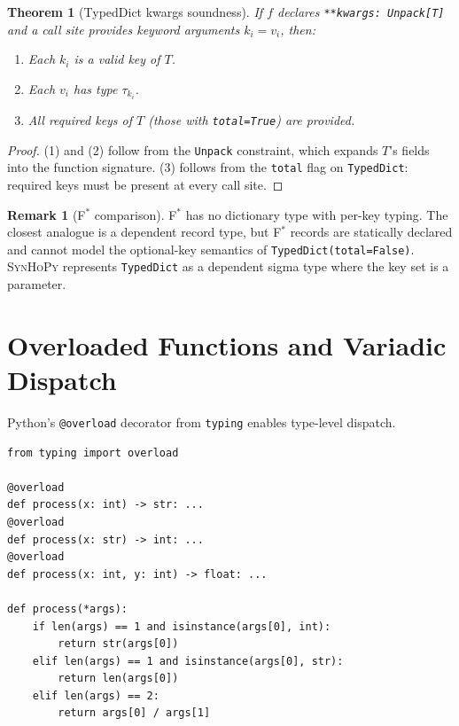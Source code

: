 \documentclass[11pt,a4paper]{report}
\theoremstyle{definition}
\newtheorem{remark}[definition]{Remark}
\theoremstyle{plain}
\newtheorem{theorem}[definition]{Theorem}
\newcommand{\fstar}{F$^{*}$}
\newcommand{\synhopy}{\textsc{SynHoPy}}
\begin{document}
\begin{theorem}[TypedDict kwargs soundness]
\label{thm:typeddict-sound}
If $f$ declares \lstinline[style=python]{**kwargs: Unpack[T]} and a call
site provides keyword arguments $k_i = v_i$, then:
\begin{enumerate}
  \item Each $k_i$ is a valid key of $T$.
  \item Each $v_i$ has type $\tau_{k_i}$.
  \item All required keys of $T$ (those with \lstinline[style=python]{total=True})
    are provided.
\end{enumerate}
\end{theorem}
\begin{proof}
(1) and (2) follow from the \lstinline[style=python]{Unpack} constraint, which
expands $T$'s fields into the function signature.
(3) follows from the \lstinline[style=python]{total} flag on
\lstinline[style=python]{TypedDict}: required keys must be present at every
call site.
\end{proof}

\begin{remark}[\fstar{} comparison]
\fstar{} has no dictionary type with per-key typing.  The closest analogue
is a dependent record type, but \fstar{} records are statically declared
and cannot model the optional-key semantics of
\lstinline[style=python]{TypedDict(total=False)}.  \synhopy{} represents
\lstinline[style=python]{TypedDict} as a dependent sigma type where the
key set is a parameter.
\end{remark}

\section{Overloaded Functions and Variadic Dispatch}

Python's \lstinline[style=python]{@overload} decorator from
\lstinline[style=python]{typing} enables type-level dispatch.

\begin{lstlisting}[style=python]
from typing import overload

@overload
def process(x: int) -> str: ...
@overload
def process(x: str) -> int: ...
@overload
def process(x: int, y: int) -> float: ...

def process(*args):
    if len(args) == 1 and isinstance(args[0], int):
        return str(args[0])
    elif len(args) == 1 and isinstance(args[0], str):
        return len(args[0])
    elif len(args) == 2:
        return args[0] / args[1]
\end{lstlisting}
\end{document}
